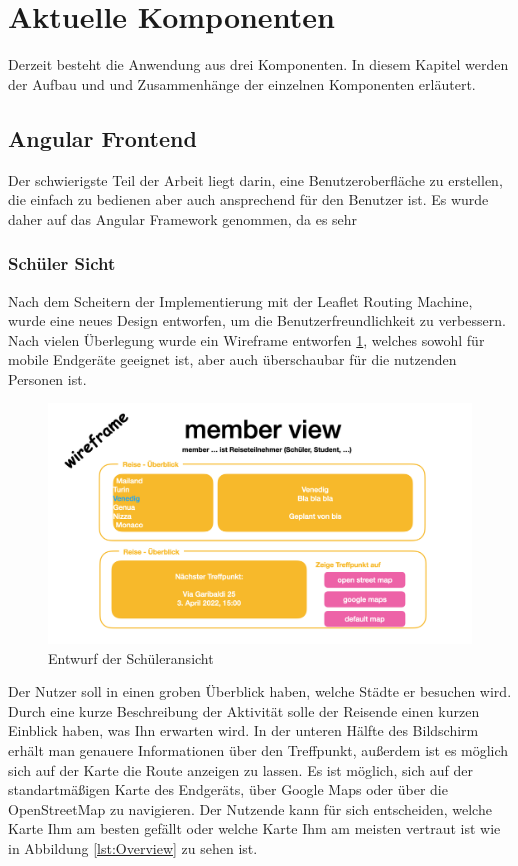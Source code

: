\section{Aktuelle Komponenten}
Derzeit besteht die Anwendung aus drei Komponenten. In diesem Kapitel werden der Aufbau und und Zusammenhänge der einzelnen Komponenten erläutert.  

\subsection{Angular Frontend}
Der schwierigste Teil der Arbeit liegt darin, eine Benutzeroberfläche zu erstellen, die einfach zu bedienen aber auch ansprechend für den Benutzer ist.
Es wurde daher auf das Angular Framework genommen, da es sehr 

\subsubsection{Schüler Sicht}

Nach dem Scheitern der Implementierung mit der Leaflet Routing Machine, wurde eine neues Design entworfen, um die Benutzerfreundlichkeit zu verbessern.
Nach vielen Überlegung wurde ein Wireframe entworfen \ref{lst:Wireframe}, welches sowohl für mobile Endgeräte geeignet ist, aber auch überschaubar für die nutzenden Personen ist.

\begin{figure}[h]
    \centering
    \includegraphics[scale=0.3]{pics/Wireframe.png}
    \caption{Entwurf der Schüleransicht }
    \label{lst:Wireframe}
\end{figure}


Der Nutzer soll in einen groben Überblick haben, welche Städte er besuchen wird. Durch eine kurze Beschreibung der Aktivität solle der Reisende einen kurzen Einblick haben, was Ihn erwarten wird. In der unteren Hälfte des Bildschirm erhält man genauere Informationen über den Treffpunkt, außerdem ist es möglich sich auf der Karte die Route anzeigen zu lassen. Es ist möglich, sich auf der standartmäßigen Karte des Endgeräts, über Google Maps oder über die OpenStreetMap zu navigieren. Der Nutzende kann für sich entscheiden, welche Karte Ihm am besten gefällt oder welche Karte Ihm am meisten vertraut ist wie in Abbildung \ref{lst:Overview} zu sehen ist.

